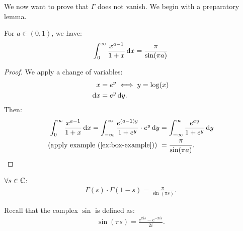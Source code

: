 We now want to prove that $\Gamma$ does not vanish. We begin with a preparatory lemma.

\begin{lemma}\label{lem:g-integral-calc-lemma}
For $a \in (0,1)$, we have:
\begin{align*}
    \int_0^\infty \frac{x^{a-1}}{1+x}\dif x = \frac{\pi}{\sin(\pi a)}
\end{align*}
\end{lemma}


\begin{proof}
We apply a change of variables:
\begin{align*}
    x &= e^y \iff y = \log(x)\\
    \dif x &= e^y \dif y.
\end{align*}
Then:
\begin{align*}
    \int_0^\infty \frac{x^{a-1}}{1+x} \dif x = \int_{- \infty}^\infty \frac{e^{(a-1)y}}{1+e^y}\cdot e^y \dif y &= \int_{-\infty }^\infty \frac{e^{ay}}{1+e^y} \dif y\\
     \text{(apply example (\ref{ex:box-example})) } &= \frac{\pi}{\sin(\pi a)}.
\end{align*}
\end{proof}

\begin{theorem}\label{thm:g-f-eq}
$\forall s \in \mathbb{C}$: 
\begin{align*}
\Gamma(s) \cdot \Gamma(1-s) = \frac{\pi}{\sin(\pi s)}.
\end{align*}

\end{theorem}

\begin{note}
Recall that the complex $\sin$ is defined as:
\begin{align*}
    \sin(\pi s) = \frac{e^{\pi i s} - e^{- \pi i s}}{2i}.
\end{align*}
\end{note}

